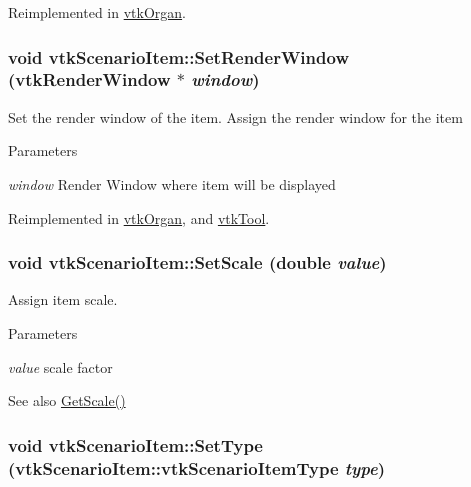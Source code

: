 Reimplemented in \hyperlink{classvtkOrgan_a55ca17e15fea6a6c1672f8b271546e6b}{vtkOrgan}.\hypertarget{classvtkScenarioItem_a3ce404404d36c342b947f29fa02b6170}{
\subsubsection[{SetRenderWindow}]{\setlength{\rightskip}{0pt plus 5cm}void vtkScenarioItem::SetRenderWindow (vtkRenderWindow $\ast$ {\em window})}}
\label{classvtkScenarioItem_a3ce404404d36c342b947f29fa02b6170}


Set the render window of the item. Assign the render window for the item 
\begin{DoxyParams}{Parameters}
\item[{\em window}]Render Window where item will be displayed \end{DoxyParams}


Reimplemented in \hyperlink{classvtkOrgan_a2b6a862da0f1ca6cd192138cdd00b04b}{vtkOrgan}, and \hyperlink{classvtkTool_a8f036524a724871dd5f7317e3000611c}{vtkTool}.\hypertarget{classvtkScenarioItem_a4d199d1138fbfe835c36cd20efbedb1e}{
\subsubsection[{SetScale}]{\setlength{\rightskip}{0pt plus 5cm}void vtkScenarioItem::SetScale (double {\em value})}}
\label{classvtkScenarioItem_a4d199d1138fbfe835c36cd20efbedb1e}


Assign item scale. 
\begin{DoxyParams}{Parameters}
\item[{\em value}]scale factor \end{DoxyParams}
\begin{DoxySeeAlso}{See also}
\hyperlink{classvtkScenarioItem_a136a346d222abe59fd63b2f4ced9b3fa}{GetScale()} 
\end{DoxySeeAlso}
\hypertarget{classvtkScenarioItem_a9bf24104bbf25c469fa151816afdcb52}{
\subsubsection[{SetType}]{\setlength{\rightskip}{0pt plus 5cm}void vtkScenarioItem::SetType ({\bf vtkScenarioItem::vtkScenarioItemType} {\em type})}}
\label{classvtkScenarioItem_a9bf24104bbf25c469fa151816afdcb52}


